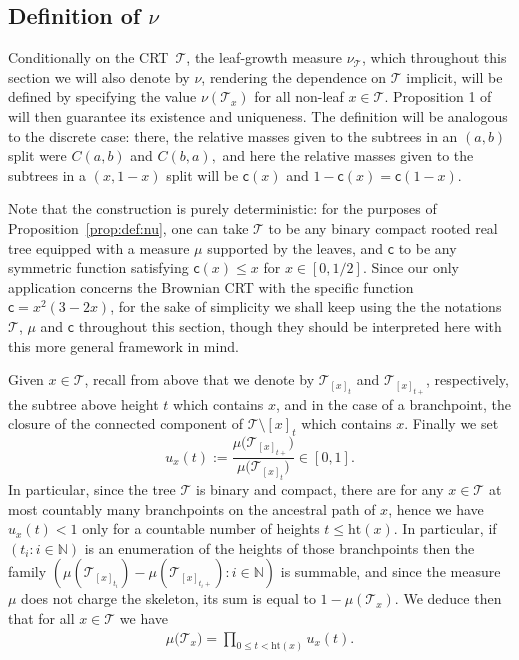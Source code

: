 \documentclass[11pt]{article}
\newcommand{\cc}{\mathsf{c}}
\newcommand{\ff}{\cc}
\newcommand{\T}{\mathcal{T}}
\renewcommand{\leq}{\leqslant}
\newcommand{\h}{\mathrm{ht}}
\begin{document}
\subsection{Definition of $\nu$}
Conditionally on the CRT~$\mathcal{T}$, the leaf-growth measure $\nu_{\mathcal{T}}$, which throughout this section we will also denote by $\nu$, rendering the dependence on $\mathcal{T}$ implicit, will be defined by specifying the value $\nu(\T_x)$ for all non-leaf $x\in\T$. Proposition 1 of \cite{Steph13} will then guarantee its existence and uniqueness. The definition will be analogous to the discrete case: there, the relative masses given to the subtrees in an $(a,b)$ split were $C(a,b)$ and $C(b,a),$ and here the relative masses given to the subtrees in a $(x,1-x)$ split will be $\ff(x)$ and $1-\ff(x)=\ff(1-x).$ 

Note that the construction is purely deterministic: for the purposes of Proposition~\ref{prop:def:nu}, one can take $\T$ to be any binary compact rooted real tree equipped with a measure $\mu$ supported by the leaves, and $ \mathsf{c}$ to be any symmetric function satisfying $ \mathsf{c}(x) \leq x$ for $x \in [0,1/2]$. Since our only application concerns the Brownian CRT with the specific function $\mathsf{c}=x^2(3-2x)$, for the sake of simplicity we shall keep using the the notations $\mathcal{T}$, $\mu$ and $\ff$ throughout this section, though they should be interpreted here with this more general framework in mind.



\medskip 

Given $x \in \T$, recall from above that we denote by $ \mathcal{T}_{[x]_t}$ and $\mathcal{T}_{[x]_{t+}}$, respectively, the subtree above height $t$ which contains $x$, and in the case of a branchpoint, the closure of the connected component of $\T\setminus{[x]_t}$ which contains $x$. Finally we set 
$$ u_x(t) := \frac{\mu\big( \T_{[x]_{t+}}\big)}{ \mu \big( \T_{[x]_t}\big)} \in [0,1].$$
In particular, since the tree $ \mathcal{T}$ is binary and compact, there are for any $x \in \T$ at most countably many branchpoints on the ancestral path of $x$, hence we have $u_x(t) < 1$ only for a countable number of heights $t \leq \h(x)$. In particular, if $(t_i : i \in  \mathbb{N})$ is an enumeration of the heights of those branchpoints then the family $ (\mu( \mathcal{T}_{[x]_{t_i}})-\mu( \mathcal{T}_{[x]_{t_i +}}): i \in \mathbb{N})$ is summable, and since the measure $\mu$ does not charge the skeleton, its sum is equal to $1- \mu( \mathcal{T}_x)$. We deduce then that for all $x \in \T$ we have
 \begin{eqnarray} \mu\big( \T_x\big) = \prod_{0 \leq t < \h(x)} u_x(t). \label{eq:noloss}\end{eqnarray}
\end{document}
